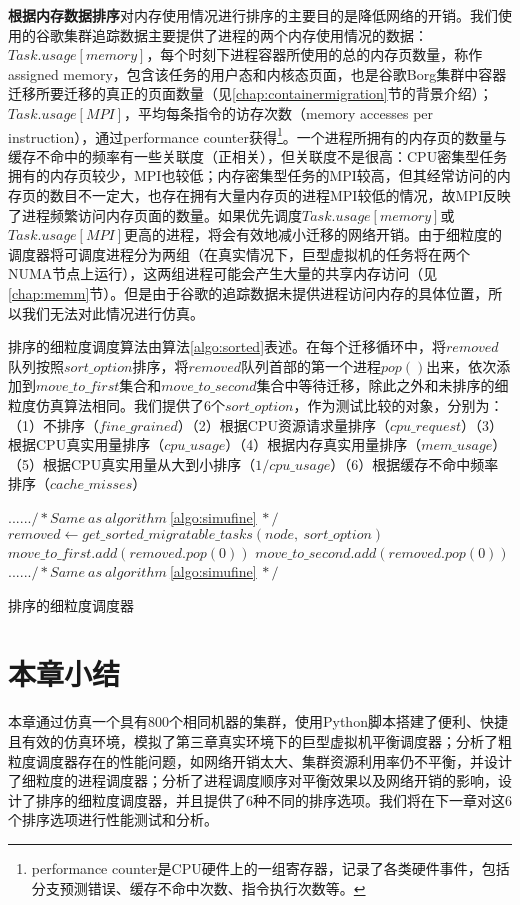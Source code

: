 \noindent\textbf{根据内存数据排序}\quad 对内存使用情况进行排序的主要目的是降低网络的开销。我们使用的谷歌集群追踪数据主要提供了进程的两个内存使用情况的数据：$Task.usage[memory]$，每个时刻下进程容器所使用的总的内存页数量，称作assigned memory，包含该任务的用户态和内核态页面，也是谷歌Borg集群中容器迁移所要迁移的真正的页面数量（见\ref{chap:containermigration}节的背景介绍）；$Task.usage[MPI]$，平均每条指令的访存次数（memory accesses per instruction），通过performance counter获得\footnote{performance counter\cite{perf}是CPU硬件上的一组寄存器，记录了各类硬件事件，包括分支预测错误、缓存不命中次数、指令执行次数等。}。一个进程所拥有的内存页的数量与缓存不命中的频率有一些关联度（正相关），但关联度不是很高：CPU密集型任务拥有的内存页较少，MPI也较低；内存密集型任务的MPI较高，但其经常访问的内存页的数目不一定大，也存在拥有大量内存页的进程MPI较低的情况，故MPI反映了进程频繁访问内存页面的数量。如果优先调度$Task.usage[memory]$或$Task.usage[MPI]$更高的进程，将会有效地减小迁移的网络开销。由于细粒度的调度器将可调度进程分为两组（在真实情况下，巨型虚拟机的任务将在两个NUMA节点上运行），这两组进程可能会产生大量的共享内存访问（见\ref{chap:memm}节）。但是由于谷歌的追踪数据未提供进程访问内存的具体位置，所以我们无法对此情况进行仿真。

排序的细粒度调度算法由算法\ref{algo:sorted}表述。在每个迁移循环中，将$removed$队列按照$sort\_option$排序，将$removed$队列首部的第一个进程$pop()$出来，依次添加到$move\_to\_first$集合和$move\_to\_second$集合中等待迁移，除此之外和未排序的细粒度仿真算法相同。我们提供了6个$sort\_option$，作为测试比较的对象，分别为：（1）不排序（$fine\_grained$）（2）根据CPU资源请求量排序（$cpu\_request$）（3）根据CPU真实用量排序（$cpu\_usage$）（4）根据内存真实用量排序（$mem\_usage$）（5）根据CPU真实用量从大到小排序（$1/cpu\_usage$）（6）根据缓存不命中频率排序（$cache\_misses$）

\begin{algorithm}[h]
\begin{algorithmic}[1]
\State $...... /* Same \ as\  algorithm\ $\ref{algo:simufine}$\ */$
\State $removed \gets get\_sorted\_migratable\_tasks(node,\ sort\_option)$
\State $move\_to\_first.add(removed.pop(0))$
\EndWhile
{}
\State $move\_to\_second.add(removed.pop(0))$
\EndWhile
\State $...... /* Same \ as\  algorithm\ $\ref{algo:simufine}$\ */$
\end{algorithmic}
\caption{排序的细粒度调度器}
\label{algo:sorted}
\end{algorithm}

\section{本章小结}
本章通过仿真一个具有800个相同机器的集群，使用Python脚本搭建了便利、快捷且有效的仿真环境，模拟了第三章真实环境下的巨型虚拟机平衡调度器；分析了粗粒度调度器存在的性能问题，如网络开销太大、集群资源利用率仍不平衡，并设计了细粒度的进程调度器；分析了进程调度顺序对平衡效果以及网络开销的影响，设计了排序的细粒度调度器，并且提供了6种不同的排序选项。我们将在下一章对这6个排序选项进行性能测试和分析。